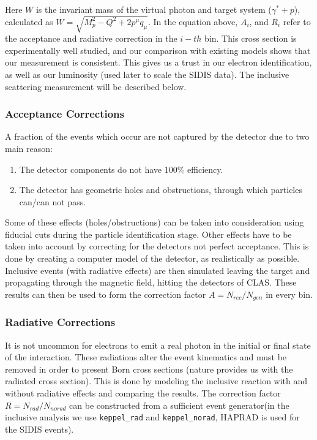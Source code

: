 Here $W$ is the invariant mass of the virtual photon and target system ($\gamma^* + p$), calculated as $W = \sqrt{M_{p}^{2} - Q^2 + 2{p^\mu} q_{\mu}}$.  In the equation above, $A_i$, and $R_i$ refer to the acceptance and radiative correction in the $i-th$ bin.  This cross section is experimentally well studied, and our comparison with existing models shows that our measurement is consistent.  This gives us a trust in our electron identification, as well as our luminosity (used later to scale the SIDIS data).  The inclusive scattering measurement will be described below.

\subsubsection{Acceptance Corrections}
A fraction of the events which occur are not captured by the detector due to two main reason: 

\begin{enumerate}
  \item The detector components do not have 100\% efficiency.
  \item The detector has geometric holes and obstructions, through which particles can/can not pass.
\end{enumerate}

Some of these effects (holes/obstructions) can be taken into consideration using fiducial cuts during the particle identification stage.  Other effects  have to be taken into account by correcting for the detectors not perfect acceptance.  This is done by creating a computer model of the detector, as realistically as possible.  Inclusive events (with radiative effects) are then simulated leaving the target and propagating through the magnetic field, hitting the detectors of CLAS.  These results can then be used to form the correction factor $A = N_{rec}/N_{gen}$ in every bin.  

\subsubsection{Radiative Corrections}
It is not uncommon for electrons to emit a real photon in the initial or final state of the interaction.  These radiations alter the event kinematics and must be removed in order to present Born cross sections (nature provides us with the radiated cross section).  This is done by modeling the inclusive reaction with and without radiative effects and comparing the results.  The correction factor $R = N_{rad}/N_{no rad}$ can be constructed from a sufficient event generator(in the inclusive analysis we use \texttt{keppel\_rad} and \texttt{keppel\_norad}, HAPRAD is used for the SIDIS events).  

